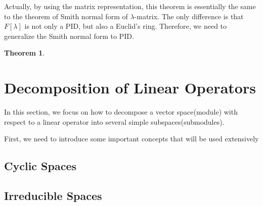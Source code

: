 \documentclass{book}
\newtheorem{theorem}{Theorem}[section]
\theoremstyle{definition}
\begin{document}
Actually, by using the matrix representation, this theorem is essentially the same to the theorem of Smith normal form of $\lambda$-matrix. The only difference is that $F[\lambda]$ is not only a PID, but also a Euclid's ring. Therefore, we need to generalize the Smith normal form to PID.
\begin{theorem}

\end{theorem}





\section{Decomposition of Linear Operators}
In this section, we focus on how to decompose a vector space(module) with respect to a linear operator into several simple subspaces(submodules).
\par First, we need to introduce some important concepts that will be used extensively



\subsection{Cyclic Spaces}


\subsection{Irreducible Spaces}
\end{document}
